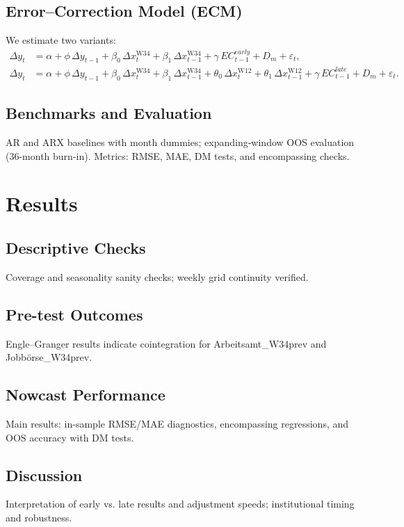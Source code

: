\documentclass[11pt,a4paper]{article}
\newcommand{\Wtwl}{\text{W12}}
\newcommand{\Wthfo}{\text{W34}}
\begin{document}
\subsection{Error--Correction Model (ECM)}
We estimate two variants:
\begin{align}
\Delta y_t &= \alpha + \phi\,\Delta y_{t-1} + \beta_0\,\Delta x^{\Wthfo}_t + \beta_1\,\Delta x^{\Wthfo}_{t-1} + \gamma\,EC^{early}_{t-1} + D_m + \varepsilon_t, \\
\Delta y_t &= \alpha + \phi\,\Delta y_{t-1} + \beta_0\,\Delta x^{\Wthfo}_t + \beta_1\,\Delta x^{\Wthfo}_{t-1} + \theta_0\,\Delta x^{\Wtwl}_t + \theta_1\,\Delta x^{\Wtwl}_{t-1} + \gamma\,EC^{late}_{t-1} + D_m + \varepsilon_t.
\end{align}

\subsection{Benchmarks and Evaluation}
AR and ARX baselines with month dummies; expanding-window OOS evaluation (36-month burn-in). Metrics: RMSE, MAE, DM tests, and encompassing checks.

\section{Results}
\subsection{Descriptive Checks}
Coverage and seasonality sanity checks; weekly grid continuity verified.

\subsection{Pre-test Outcomes}
Engle–Granger results indicate cointegration for Arbeitsamt\_W34prev and Jobbörse\_W34prev.

\subsection{Nowcast Performance}
Main results: in-sample RMSE/MAE diagnostics, encompassing regressions, and OOS accuracy with DM tests.

\subsection{Discussion}
Interpretation of early vs. late results and adjustment speeds; institutional timing and robustness.
\end{document}
